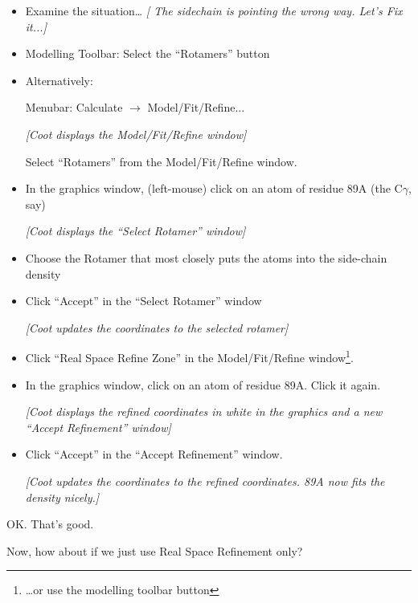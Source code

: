 \documentclass{article}
\begin{document}
\begin{itemize}
\item Examine the situation\ldots
  \emph{[ The sidechain is pointing the wrong way.  Let's Fix it...]}

\item Modelling Toolbar: Select the \textsf{``Rotamers''} button

\item Alternatively:

\subitem Menubar: \textsf{Calculate $\rightarrow$ Model/Fit/Refine...}

\textsl{ [Coot displays the Model/Fit/Refine window]}

\subitem Select \textsf{``Rotamers''} from the Model/Fit/Refine window.

\item In the graphics window, (left-mouse) click on an atom of residue
  89A (the C$\gamma$, say)

\textsl{ [Coot displays the ``Select Rotamer'' window]}

\item Choose the Rotamer that most closely puts the atoms into the
  side-chain density %

\item Click \textsf{``Accept''} in the ``Select Rotamer'' window

\textsl{ [Coot updates the coordinates to the selected rotamer]}

\item Click \textsf{``Real Space Refine Zone''} in the
  Model/Fit/Refine window\footnote{\ldots or use the modelling toolbar button}.
  
\item In the graphics window, click on an atom of residue 89A.  Click
  it again.
  
  \textsl{ [Coot displays the refined coordinates in white in the
    graphics and a new ``Accept Refinement'' window]}

\item Click \textsf{``Accept''} in the ``Accept Refinement'' window.
  
  \textsl{ [Coot updates the coordinates to the refined coordinates.
    89A now fits the density nicely.]}


\end{itemize}

OK. That's good.  

Now, how about if we just use Real Space Refinement only?
\end{document}
